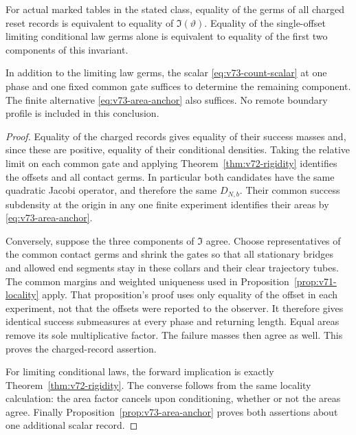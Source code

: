 \begin{theorem}
\label{thm:v73-fibers}
For actual marked tables in the stated class, equality of the germs of
all charged reset records is equivalent to equality of
$\mathfrak I(\vartheta)$.  Equality of the single-offset limiting
conditional law germs alone is equivalent to equality of the first two
components of this invariant.

In addition to the limiting law germs, the scalar
\eqref{eq:v73-count-scalar} at one phase and one fixed common gate
suffices to determine the remaining component.  The finite alternative
\eqref{eq:v73-area-anchor} also suffices.  No remote boundary profile is
included in this conclusion.
\end{theorem}
\begin{proof}
Equality of the charged records gives equality of their success masses
and, since these are positive, equality of their conditional densities.
Taking the relative limit on each common gate and applying
Theorem~\ref{thm:v72-rigidity} identifies the offsets and all contact
germs.  In particular both candidates have the same quadratic Jacobi
operator, and therefore the same $D_{N,b}$.  Their common success
subdensity at the origin in any one finite experiment identifies their
areas by \eqref{eq:v73-area-anchor}.

Conversely, suppose the three components of $\mathfrak I$ agree.
Choose representatives of the common contact germs and shrink the gates
so that all stationary bridges and allowed end segments stay in these
collars and their clear trajectory tubes.  The common margins and weighted
uniqueness used in Proposition~\ref{prop:v71-locality} apply.  That
proposition's proof uses only equality of the offset in each experiment,
not that the offsets were reported to the observer.  It therefore gives
identical success submeasures at every phase and returning length.
Equal areas remove its sole multiplicative factor.  The failure masses
then agree as well.  This proves the charged-record assertion.

For limiting conditional laws, the forward implication is exactly
Theorem~\ref{thm:v72-rigidity}.  The converse follows from the same
locality calculation: the area factor cancels upon conditioning, whether
or not the areas agree.  Finally
Proposition~\ref{prop:v73-area-anchor} proves both assertions about
one additional scalar record.
\end{proof}

